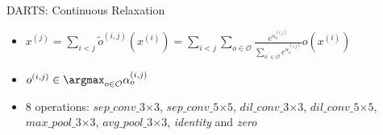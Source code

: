 \begin{frame}{DARTS: Continuous Relaxation}

        \begin{centering}
        {\footnotesize
        \begin{itemize}
            \item $x^{(j)} = \sum_{i<j}\tilde{o}^{(i,j)}(x^{(i)}) = \sum_{i<j}\sum_{o\in\mathcal{O}}\frac{e^{\alpha_{o}^{(i,j)}}}{\sum_{o^{\prime}\in\mathcal{O}}e^{\alpha_{o^{\prime}}^{(i,j)}}}o(x^{(i)})$
            \item $o^{(i,j)} \in \argmax_{o\in\mathcal{O}}\alpha_{o}^{(i,j)}$
            \item 8 operations: $sep\_conv\_3$$\times$$3$, $sep\_conv\_5$$\times$$5$, $dil\_conv\_3$$\times$$3$, $dil\_conv\_5$$\times$$5$, $max\_pool\_3$$\times$$3$, $avg\_pool\_3$$\times$$3$, \textit{identity} and \textit{zero}
        \end{itemize}}%
        \end{centering}


\end{frame}
